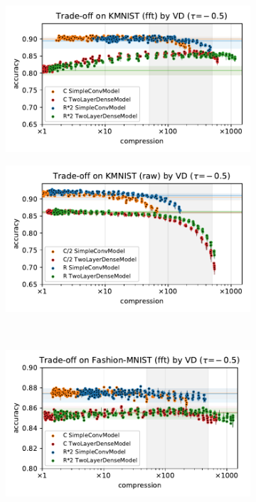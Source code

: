 \documentclass[a4paper,10pt,onecolumn]{article}
\begin{document}
\begin{figure}[b]
  \begin{subfigure}[b]{0.5\columnwidth}
    \centering
    \includegraphics[width=\columnwidth]{figure__mnist-like__trade-off/appendix__cmp__VD__kmnist__fft__-0.5.pdf}
  \end{subfigure}%
  \begin{subfigure}[b]{0.5\columnwidth}
    \centering
    \includegraphics[width=\columnwidth]{figure__mnist-like__trade-off/appendix__cmp__VD__kmnist__raw__-0.5.pdf}
  \end{subfigure} \\%
  \begin{subfigure}[b]{0.5\columnwidth}
    \centering
    \includegraphics[width=\columnwidth]{figure__mnist-like__trade-off/appendix__cmp__VD__fashionmnist__fft__-0.5.pdf}

\end{subfigure}
\end{figure}
\end{document}
